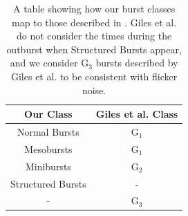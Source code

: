 \begin{table}
\centering
\begin{tabular}{c c}
\hline
\hline
 \scriptsize Our Class & \scriptsize Giles et al. Class  \\
\hline
Normal Bursts & G$_1$ \\
Mesobursts & G$_1$ \\
Minibursts & G$_2$ \\
Structured Bursts & - \\
 - & G$_3$ \\
\hline
\hline
\end{tabular}
\caption{A table showing how our burst classes map to those described in \citet{Giles_BP}.  Giles et al. do not consider the times during the outburst when Structured Bursts appear, and we consider G$_3$ bursts described by Giles et al. to be consistent with flicker noise.}
\label{tab:classcomp}
\end{table}


